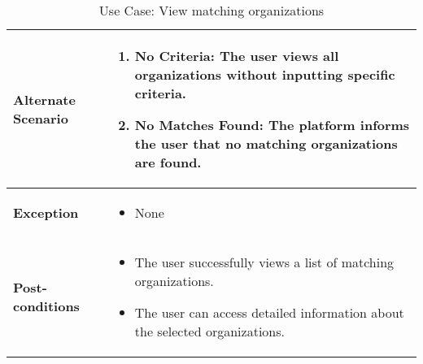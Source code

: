 \begin{table}[!ht]
\begin{tabularx}{\textwidth}{|l|X|}
        \hline
        \textbf{Alternate Scenario} & 
        \begin{enumerate}[label=\arabic*.,itemsep=0pt]
            \item No Criteria: The user views all organizations without inputting specific criteria.
            \item No Matches Found: The platform informs the user that no matching organizations are found.
        \end{enumerate} \\
        \hline
        \textbf{Exception} & 
        \begin{itemize}[label=--,itemsep=0pt]
            \item None
        \end{itemize} \\
        \hline
        \textbf{Post-conditions} & 
        \begin{itemize}[label=--,itemsep=0pt]
            \item The user successfully views a list of matching organizations.
            \item The user can access detailed information about the selected organizations.
        \end{itemize} \\
        \hline
    \end{tabularx}
    \caption{Use Case: View matching organizations}
    \label{tab:use-case-register}
\end{table}


